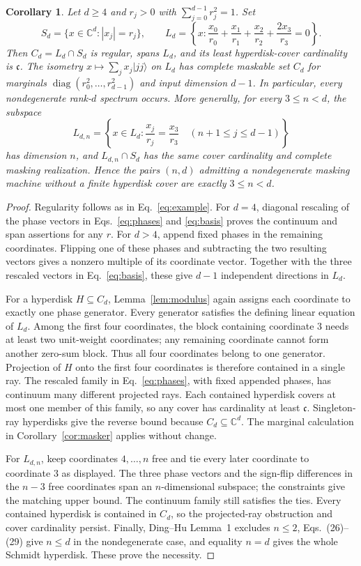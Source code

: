\documentclass[11pt]{article}
\newtheorem{corollary}[theorem]{Corollary}
\newcommand{\C}{\mathbb C}
\newcommand{\diag}{\operatorname{diag}}
\begin{document}
\begin{corollary}\label{cor:spectra}
Let $d\ge4$ and $r_j>0$ with $\sum_{j=0}^{d-1}r_j^2=1$. Set
\[
 S_d=\{x\in\C^d:|x_j|=r_j\},\qquad
 L_d=\left\{x:\frac{x_0}{r_0}+\frac{x_1}{r_1}
                 +\frac{x_2}{r_2}+\frac{2x_3}{r_3}=0\right\}.
\]
Then $C_d=L_d\cap S_d$ is regular, spans $L_d$, and its least
hyperdisk-cover cardinality is $\mathfrak c$.
The isometry $x\mapsto\sum_jx_j|jj\rangle$ on $L_d$ has complete maskable
set $C_d$ for marginals $\diag(r_0^2,\ldots,r_{d-1}^2)$ and input dimension
$d-1$. In particular, every nondegenerate rank-$d$ spectrum occurs.
More generally, for every $3\le n<d$, the subspace
\[
 L_{d,n}=\left\{x\in L_d:
       \frac{x_j}{r_j}=\frac{x_3}{r_3}\quad(n+1\le j\le d-1)\right\}
\]
has dimension $n$, and $L_{d,n}\cap S_d$ has the same cover cardinality
and complete masking realization. Hence the pairs $(n,d)$ admitting a
nondegenerate masking machine without a finite hyperdisk cover are
exactly $3\le n<d$.
\end{corollary}
\begin{proof}
Regularity follows as in Eq.~\eqref{eq:example}. For $d=4$, diagonal
rescaling of the phase vectors in Eqs.~\eqref{eq:phases} and
\eqref{eq:basis} proves the continuum and span assertions for any $r$.
For $d>4$, append fixed phases in the remaining coordinates. Flipping
one of these phases and subtracting the two resulting vectors gives
a nonzero multiple of its coordinate vector. Together with the three
rescaled vectors in Eq.~\eqref{eq:basis}, these give $d-1$ independent
directions in $L_d$.

For a hyperdisk $H\subseteq C_d$, Lemma~\ref{lem:modulus} again assigns
each coordinate to exactly one phase generator. Every generator satisfies
the defining linear equation of $L_d$. Among the first four coordinates,
the block containing coordinate $3$ needs at least two unit-weight
coordinates; any remaining coordinate cannot form another zero-sum block.
Thus all four coordinates belong to one generator. Projection of $H$
onto the first four coordinates is therefore contained in a single ray.
The rescaled family in Eq.~\eqref{eq:phases}, with fixed appended phases,
has continuum many different projected rays. Each contained hyperdisk
covers at most one member of this family, so any cover has cardinality
at least $\mathfrak c$. Singleton-ray hyperdisks give the reverse bound
because $C_d\subseteq\C^d$. The marginal calculation in
Corollary~\ref{cor:masker} applies without change.

For $L_{d,n}$, keep coordinates $4,\ldots,n$ free and tie every later
coordinate to coordinate $3$ as displayed. The three phase vectors and
the sign-flip differences in the $n-3$ free coordinates span an
$n$-dimensional subspace; the constraints give the matching upper bound.
The continuum family still satisfies the ties. Every contained hyperdisk
is contained in $C_d$, so the projected-ray obstruction and cover
cardinality persist. Finally, Ding--Hu Lemma~1 excludes $n\le2$,
Eqs.~(26)--(29) give $n\le d$ in the nondegenerate case, and equality
$n=d$ gives the whole Schmidt hyperdisk. These prove the necessity.
\end{proof}
\end{document}
